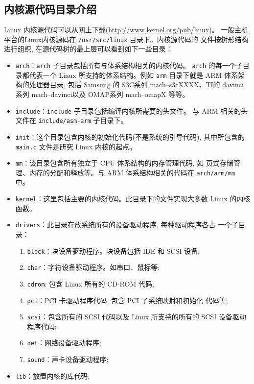\subsection{内核源代码目录介绍}
Linux 内核源代码可以从网上下载(\url{http://www.kernel.org/pub/linux})。
一般主机平台的Linux内核源码在 \verb|/usr/src/linux| 目录下。内核源代码的
文件按树形结构进行组织, 在源代码树的最上层可以看到如下一些目录：
\begin{itemize}
    \item \verb|arch|：\verb|arch| 子目录包括所有与体系结构相关的内核代码。
        \verb|arch| 的每一个子目录都代表一个 Linux 所支持的体系结构。例如
        \verb|arm| 目录下就是 ARM 体系架构的处理器目录, 包括 Samsung 的
        S3C系列 mach--s3cXXXX、TI的 davinci 系列 mach--davinci以及 OMAP系列
        mach--omapX 等等。
    \item \verb|include|：\verb|include| 子目录包括编译内核所需要的头文件。
        与 ARM 相关的头文件在 \verb|include/asm-arm| 子目录下。
    \item \verb|init|：这个目录包含内核的初始化代码(不是系统的引导代码),
        其中所包含的 \verb|main.c| 文件是研究 Linux 内核的起点。
    \item \verb|mm|：该目录包含所有独立于 CPU 体系结构的内存管理代码, 如
        页式存储管理、内存的分配和释放等。与 ARM 体系结构相关的代码在
        \verb|arch/arm/mm| 中。
    \item \verb|kernel|：这里包括主要的内核代码。此目录下的文件实现大多数
        Linux 的内核函数。
    \item \verb|drivers|：此目录存放系统所有的设备驱动程序, 每种驱动程序各占
        一个子目录：
    \begin{enumerate}
        \item \verb|block|：块设备驱动程序。块设备包括 IDE 和 SCSI 设备;
        \item \verb|char|：字符设备驱动程序。如串口、鼠标等;
        \item \verb|cdrom|: 包含 Linux 所有的 CD-ROM 代码;
        \item \verb|pci|：PCI 卡驱动程序代码, 包含 PCI 子系统映射和初始化
            代码等;
        \item \verb|scsi|：包含所有的 SCSI 代码以及 Linux 所支持的所有的
            SCSI 设备驱动程序代码;
        \item \verb|net|：网络设备驱动程序;
        \item \verb|sound|：声卡设备驱动程序;
    \end{enumerate}
    \item \verb|lib|：放置内核的库代码;

\end{itemize}
